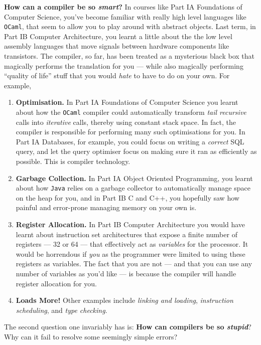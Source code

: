 \textbf{How can a compiler be so \emph{smart}?} In courses like {\sffamily Part IA Foundations of Computer Science}, you've become familiar with really high level languages like \texttt{OCaml}, that seem to allow you to play around with abstract objects. Last term, in {\sffamily Part IB Computer Architecture}, you learnt a little about the the low level assembly languages that move signals between hardware components like transistors. The compiler, so far, has been treated as a mysterious black box that magically performs the translation for you --- while also magically performing ``quality of life'' stuff that you would \emph{hate} to have to do on your own. For example,

\begin{enumerate}
    \item \textbf{Optimisation.} In {\sffamily Part IA Foundations of Computer Science} you learnt about how the \texttt{OCaml} compiler could automatically transform \emph{tail recursive} calls into \emph{iterative} calls, thereby using constant stack space. In fact, the compiler is responsible for performing many such optimisations for you. In {\sffamily Part IA Databases}, for example, you could focus on writing a \emph{correct} SQL query, and let the query optimiser focus on making sure it ran as efficiently as possible. This is compiler technology.
    \item \textbf{Garbage Collection.} In {\sffamily Part IA Object Oriented Programming}, you learnt about how \texttt{Java} relies on a garbage collector to automatically manage space on the heap for you, and in {\sffamily Part IB C and C++}, you hopefully saw how painful and error-prone managing memory on your own is. 
    \item \textbf{Register Allocation.} In {\sffamily Part IB Computer Architecture} you would have learnt about instruction set architectures that expose a finite number of registers --- 32 or 64 --- that effectively act as \emph{variables} for the processor. It would be horrendous if \emph{you} as the programmer were limited to using these registers as variables. The fact that you are not --- and that you can use any number of variables as you'd like --- is because the compiler will handle register allocation for you.
    \item \textbf{Loads More!} Other examples include \emph{linking and loading}, \emph{instruction scheduling}, and \emph{type checking}.
\end{enumerate}

The second question one invariably has is: \textbf{How can compilers be so \emph{stupid}}? Why can it fail to resolve some seemingly simple errors?

